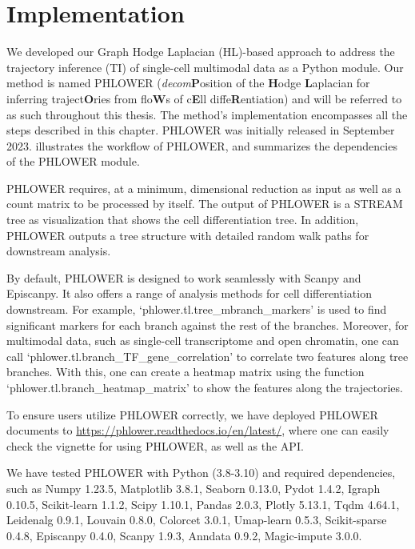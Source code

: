 \section{Implementation}
\label{TI_methods:implementation}
We developed our Graph Hodge Laplacian (HL)-based approach to address the trajectory inference (TI) of single-cell multimodal data as a Python module. Our method is named PHLOWER (\textit{decom}\textbf{P}osition of the \textbf{H}odge \textbf{L}aplacian for inferring traject\textbf{O}ries from flo\textbf{W}s of c\textbf{E}ll diffe\textbf{R}entiation) and will be referred to as such throughout this thesis. The method's implementation encompasses all the steps described in this chapter. PHLOWER was initially released in September 2023.  illustrates the workflow of PHLOWER, and  summarizes the dependencies of the PHLOWER module.

PHLOWER requires, at a minimum, dimensional reduction as input as well as a count matrix to be processed by itself. The output of PHLOWER is a STREAM tree as visualization that shows the cell differentiation tree. In addition, PHLOWER outputs a tree structure with detailed random walk paths for downstream analysis.

By default, PHLOWER is designed to work seamlessly with Scanpy and Episcanpy. It also offers a range of analysis methods for cell differentiation downstream. For example, `phlower.tl.tree\_mbranch\_markers' is used to find significant markers for each branch against the rest of the branches. Moreover, for multimodal data, such as single-cell transcriptome and open chromatin, one can call `phlower.tl.branch\_TF\_gene\_correlation' to correlate two features along tree branches. With this, one can create a heatmap matrix using the function `phlower.tl.branch\_heatmap\_matrix' to show the features along the trajectories.

To ensure users utilize PHLOWER correctly, we have deployed PHLOWER documents to \url{https://phlower.readthedocs.io/en/latest/}, where one can easily check the vignette for using PHLOWER, as well as the API.

We have tested PHLOWER with Python (3.8-3.10) and required dependencies, such as Numpy 1.23.5, Matplotlib 3.8.1, Seaborn 0.13.0, Pydot 1.4.2, Igraph 0.10.5, Scikit-learn 1.1.2, Scipy 1.10.1, Pandas 2.0.3, Plotly 5.13.1, Tqdm 4.64.1, Leidenalg 0.9.1, Louvain 0.8.0, Colorcet 3.0.1, Umap-learn 0.5.3, Scikit-sparse 0.4.8, Episcanpy 0.4.0, Scanpy 1.9.3, Anndata 0.9.2, Magic-impute 3.0.0.

